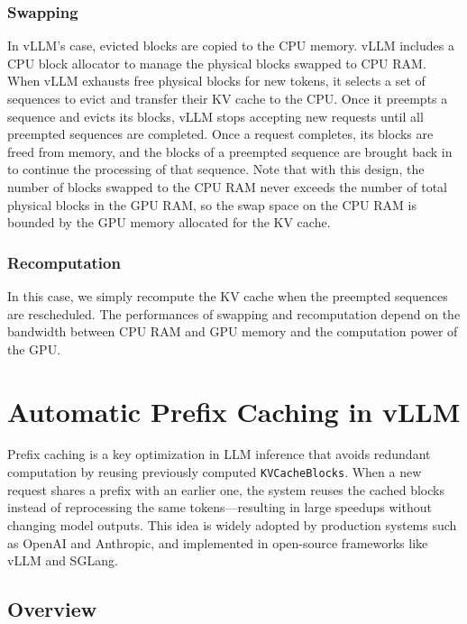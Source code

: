 \subsubsection{Swapping}
In vLLM's case, evicted blocks are copied to the CPU memory. vLLM includes a CPU block allocator to manage the physical blocks swapped to CPU RAM. When vLLM exhausts free physical blocks for new tokens, it selects a set of sequences to evict and transfer their KV cache to the CPU. Once it preempts a sequence and evicts its blocks, vLLM stops accepting new requests until all preempted sequences are completed. Once a request completes, its blocks are freed from memory, and the blocks of a preempted sequence are brought back in to continue the processing of that sequence. Note that with this design, the number of blocks swapped to the CPU RAM never exceeds the number of total physical blocks in the GPU RAM, so the swap space on the CPU RAM is bounded by the GPU memory allocated for the KV cache.


\subsubsection{Recomputation}
In this case, we simply recompute the KV cache when the preempted sequences are rescheduled. The performances of swapping and recomputation depend on the bandwidth between CPU RAM and GPU memory and the computation power of the GPU. 


\section{Automatic Prefix Caching in vLLM}

Prefix caching\cite{vllm_automatic_prefix_caching} is a key optimization in LLM inference that avoids redundant computation by reusing previously computed \texttt{KVCacheBlocks}.  
When a new request shares a prefix with an earlier one, the system reuses the cached blocks instead of reprocessing the same tokens—resulting in large speedups without changing model outputs.  
This idea is widely adopted by production systems such as OpenAI and Anthropic, and implemented in open-source frameworks like vLLM and SGLang.

\subsection{Overview}

